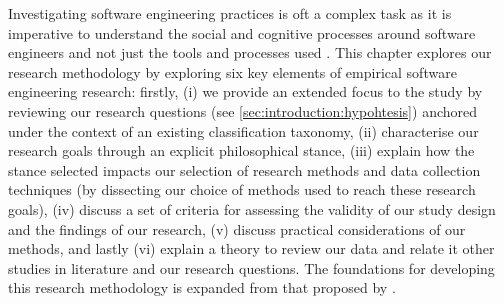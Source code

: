 \label{sec:research-methodology:preface}

Investigating software engineering practices is oft a complex task as it is imperative to understand the social and cognitive processes around software engineers and not just the tools and processes used \citep{Easterbrook:2007ws}. This chapter explores our research methodology by exploring six key elements of empirical software engineering research: firstly, (i) we provide an extended focus to the study by reviewing our research questions (see \cref{sec:introduction:hypohtesis}) anchored under the context of an existing classification taxonomy, (ii) characterise our research goals through an explicit philosophical stance, (iii) explain how the stance selected impacts our selection of research methods and data collection techniques (by dissecting our choice of methods used to reach these research goals), (iv) discuss a set of criteria for assessing the validity of our study design and the findings of our research, (v) discuss practical considerations of our methods, and lastly (vi) explain a theory to review our data and relate it other studies in literature and our research questions. The foundations for developing this research methodology is expanded from that proposed by \citet{Easterbrook:2007ws}.